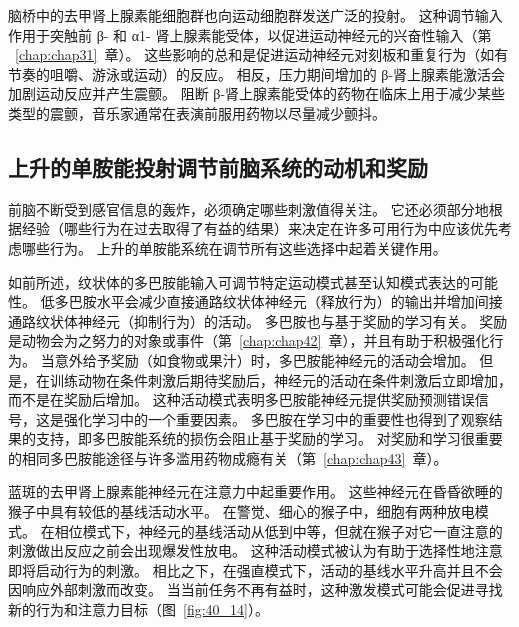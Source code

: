 脑桥中的去甲肾上腺素能细胞群也向运动细胞群发送广泛的投射。
这种调节输入作用于突触前 β- 和 α1- 肾上腺素能受体，以促进运动神经元的兴奋性输入（第 ~\ref{chap:chap31}~章）。
这些影响的总和是促进运动神经元对刻板和重复行为（如有节奏的咀嚼、游泳或运动）的反应。
相反，压力期间增加的 β-肾上腺素能激活会加剧运动反应并产生震颤。
阻断 β-肾上腺素能受体的药物在临床上用于减少某些类型的震颤，音乐家通常在表演前服用药物以尽量减少颤抖。



\subsection{上升的单胺能投射调节前脑系统的动机和奖励}

前脑不断受到感官信息的轰炸，必须确定哪些刺激值得关注。
它还必须部分地根据经验（哪些行为在过去取得了有益的结果）来决定在许多可用行为中应该优先考虑哪些行为。
上升的单胺能系统在调节所有这些选择中起着关键作用。


如前所述，纹状体的多巴胺能输入可调节特定运动模式甚至认知模式表达的可能性。
低多巴胺水平会减少直接通路纹状体神经元（释放行为）的输出并增加间接通路纹状体神经元（抑制行为）的活动。
多巴胺也与基于奖励的学习有关。 奖励是动物会为之努力的对象或事件（第~\ref{chap:chap42}~章），并且有助于积极强化行为。
当意外给予奖励（如食物或果汁）时，多巴胺能神经元的活动会增加。
但是，在训练动物在条件刺激后期待奖励后，神经元的活动在条件刺激后立即增加，而不是在奖励后增加。
这种活动模式表明多巴胺能神经元提供奖励预测错误信号，这是强化学习中的一个重要因素。
多巴胺在学习中的重要性也得到了观察结果的支持，即多巴胺能系统的损伤会阻止基于奖励的学习。
对奖励和学习很重要的相同多巴胺能途径与许多滥用药物成瘾有关（第~\ref{chap:chap43}~章）。


蓝斑的去甲肾上腺素能神经元在注意力中起重要作用。
这些神经元在昏昏欲睡的猴子中具有较低的基线活动水平。
在警觉、细心的猴子中，细胞有两种放电模式。
在相位模式下，神经元的基线活动从低到中等，但就在猴子对它一直注意的刺激做出反应之前会出现爆发性放电。
这种活动模式被认为有助于选择性地注意即将启动行为的刺激。
相比之下，在强直模式下，活动的基线水平升高并且不会因响应外部刺激而改变。
当当前任务不再有益时，这种激发模式可能会促进寻找新的行为和注意力目标（图~\ref{fig:40_14}）。


